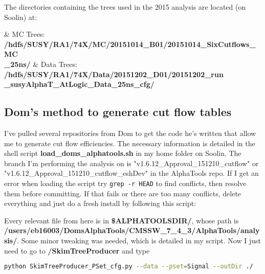 The directories containing the trees used in the 2015 analysis are located (on Soolin) at:

\begin{easylist}
\easylistprops
& MC Trees: \textbf{/hdfs/SUSY/RA1/74X/MC/20151014\_B01/20151014\_SixCutflows\_MC\\\_25ns/}
& Data Trees: \textbf{/hdfs/SUSY/RA1/74X/Data/20151202\_D01/20151202\_run\\\_susyAlphaT\_AtLogic\_Data\_25ns\_cfg/}
\end{easylist}

\subsection{Dom's method to generate cut flow tables}
\label{subsubsec:currentprocedurecutflows}

I've pulled several repositories from Dom to get the code he's written that allow me to generate cut flow efficiencies. The necessary information is detailed in the shell script \textbf{load\_doms\_alphatools.sh} in my home folder on Soolin. The branch I'm performing the analysis on is "v1.6.12\_Approval\_151210\_cutflow" or "v1.6.12\_Approval\_151210\_cutflow\_eshDev" in the AlphaTools repo. If I get an error when loading the script try \texttt{grep -r HEAD} to find conflicts, then resolve them before committing. If that fails or there are too many conflicts, delete everything and just do a fresh install by following this script:



Every relevant file from here is in \textbf{\$ALPHATOOLSDIR/}, whose path is \textbf{/users/eb16003/DomsAlphaTools/CMSSW\_7\_4\_3/AlphaTools/analysis/}. Some minor tweaking was needed, which is detailed in my script. Now I just need to go to \textbf{/SkimTreeProducer} and type

\begin{lstlisting}[belowskip=-0.7cm, language=sh, numbers=none]
python SkimTreeProducer_PSet_cfg.py --data --pset=Signal --outDir ./
\end{lstlisting}

